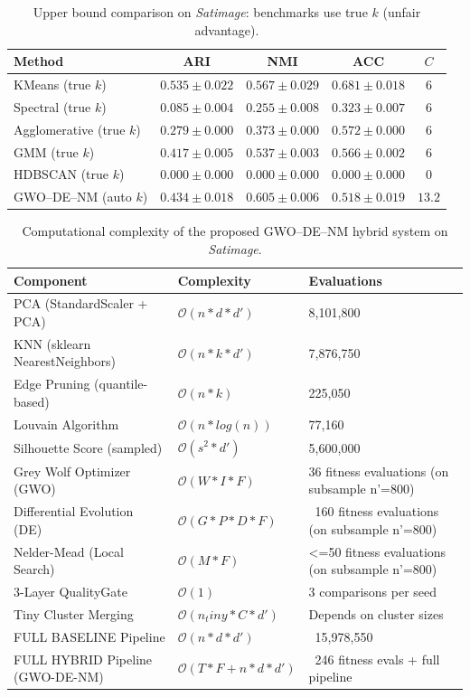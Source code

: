 \begin{table}[htbp]
\centering\small
\caption{Upper bound comparison on \textit{Satimage}: benchmarks use true $k$ (unfair advantage).}
\label{tab:upper_satimage}
\begin{tabular}{lcccc}
\toprule
Method & ARI & NMI & ACC & $C$ \\
\midrule
KMeans (true $k$) & $0.535 \pm 0.022$ & $0.567 \pm 0.029$ & $0.681 \pm 0.018$ & $6$ \\
Spectral (true $k$) & $0.085 \pm 0.004$ & $0.255 \pm 0.008$ & $0.323 \pm 0.007$ & $6$ \\
Agglomerative (true $k$) & $0.279 \pm 0.000$ & $0.373 \pm 0.000$ & $0.572 \pm 0.000$ & $6$ \\
GMM (true $k$) & $0.417 \pm 0.005$ & $0.537 \pm 0.003$ & $0.566 \pm 0.002$ & $6$ \\
HDBSCAN (true $k$) & $0.000 \pm 0.000$ & $0.000 \pm 0.000$ & $0.000 \pm 0.000$ & $0$ \\
\midrule
GWO--DE--NM (auto $k$) & $\mathbf{0.434 \pm 0.018}$ & $\mathbf{0.605 \pm 0.006}$ & $\mathbf{0.518 \pm 0.019}$ & $13.2$ \\
\bottomrule
\end{tabular}
\end{table}

\begin{table}[htbp]
\centering
\small
\caption{Computational complexity of the proposed GWO--DE--NM hybrid system on \textit{Satimage}.}
\label{tab:complexity_satimage}
\begin{tabular}{lll}
\toprule
Component & Complexity & Evaluations \\
\midrule
PCA (StandardScaler + PCA) & $\mathcal{O}(n * d * d')$ & 8,101,800 \\
KNN (sklearn NearestNeighbors) & $\mathcal{O}(n * k * d')$ & 7,876,750 \\
Edge Pruning (quantile-based) & $\mathcal{O}(n * k)$ & 225,050 \\
Louvain Algorithm & $\mathcal{O}(n * log(n))$ & 77,160 \\
Silhouette Score (sampled) & $\mathcal{O}(s^2 * d')$ & 5,600,000 \\
Grey Wolf Optimizer (GWO) & $\mathcal{O}(W * I * F)$ & 36 fitness evaluations (on subsample n'=800) \\
Differential Evolution (DE) & $\mathcal{O}(G * P * D * F)$ & ~160 fitness evaluations (on subsample n'=800) \\
Nelder-Mead (Local Search) & $\mathcal{O}(M * F)$ & <=50 fitness evaluations (on subsample n'=800) \\
3-Layer QualityGate & $\mathcal{O}(1)$ & 3 comparisons per seed \\
Tiny Cluster Merging & $\mathcal{O}(n_tiny * C * d')$ & Depends on cluster sizes \\
\midrule
FULL BASELINE Pipeline & $\mathcal{O}(n * d * d')$ & ~15,978,550 \\
\midrule
FULL HYBRID Pipeline (GWO-DE-NM) & $\mathcal{O}(T * F + n * d * d')$ & ~246 fitness evals + full pipeline \\
\bottomrule
\end{tabular}
\end{table}